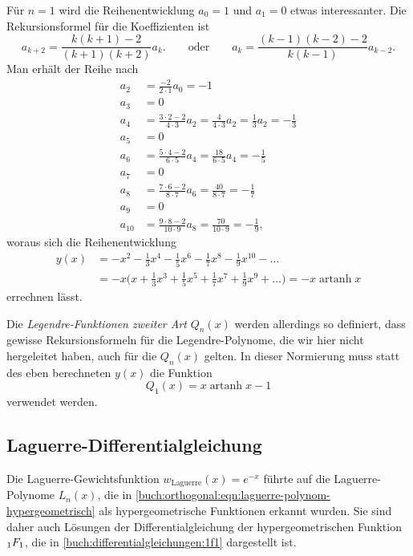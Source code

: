 Für $n=1$ wird die Reihenentwicklung $a_0=1$ und $a_1=0$ etwas
interessanter.
Die Rekursionsformel für die Koeffizienten ist
\[
a_{k+2}
=
\frac{k(k+1)-2}{(k+1)(k+2)} a_k.
\qquad\text{oder}\qquad
a_k
=
\frac{(k-1)(k-2)-2}{k(k-1)}
a_{k-2}.
\]
Man erhält der Reihe nach
\begin{align*}
a_2 &= \frac{-2}{2\cdot 1} a_0 = -1
\\
a_3 &= 0
\\
a_4 &= \frac{3\cdot 2-2}{4\cdot 3} a_2 = \frac{4}{4\cdot 3}a_2 = \frac13a_2 = -\frac13
\\
a_5 &= 0
\\
a_6 &= \frac{5\cdot 4-2}{6\cdot 5}a_4 = \frac{18}{6\cdot 5}a_4 = -\frac15
\\
a_7 &= 0
\\
a_8 &= \frac{7\cdot 6-2}{8\cdot 7}a_6 = \frac{40}{8\cdot 7} = -\frac17
\\
a_9 &= 0
\\
a_{10} &= \frac{9\cdot 8-2}{10\cdot 9}a_8 = \frac{70}{10\cdot 9} = -\frac19,
\end{align*}
woraus sich die Reihenentwicklung
\begin{align*}
y(x)
&=
-x^2 -\frac13x^4 -\frac15x^6 - \frac17x^8 -\frac19x^{10}-\dots
\\
&=
-x\biggl(x+\frac13x^3 + \frac15x^5 + \frac17x^7 + \frac19x^9+\dots\biggr)
=
-x\operatorname{artanh}x
\end{align*}
errechnen lässt.

Die {\em Legendre-Funktionen zweiter Art} $Q_n(x)$  werden allerdings
so definiert, dass gewisse Rekursionsformeln für die Legendre-Polynome,
die wir hier nicht hergeleitet haben, auch für die $Q_n(x)$ gelten.
In dieser Normierung muss statt des eben berechneten $y(x)$ die Funktion
\[
Q_1(x) = x \operatorname{artanh}x-1
\]
verwendet werden.

%
%
\subsection{Laguerre-Differentialgleichung
\label{buch:orthogonal:subsection:laguerre-differentialgleichung}}
Die Laguerre-Gewichtsfunktion $w_{\text{Laguerre}}(x)=e^{-x}$
%
führte auf die Laguerre-Polynome $L_n(x)$, die in 
\eqref{buch:orthogonal:eqn:laguerre-polynom-hypergeometrisch}
als hypergeometrische Funktionen erkannt wurden.
Sie sind daher auch Lösungen der Differentialgleichung
der hypergeometrischen Funktion $\mathstrut_1F_1$, die in
\eqref{buch:differentialgleichungen:1f1} dargestellt ist.

